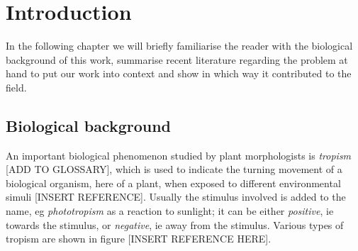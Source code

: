 
\chapter{Introduction} %

\label{introduction} %


\newcommand{\keyword}[1]{\textbf{#1}}
\newcommand{\tabhead}[1]{\textbf{#1}}
\newcommand{\code}[1]{\texttt{#1}}
\newcommand{\file}[1]{\texttt{\bfseries#1}}
\newcommand{\option}[1]{\texttt{\itshape#1}}



In the following chapter we will briefly familiarise the reader with the biological background of this work, summarise recent literature regarding the problem at hand to put our work into context and show in which way it contributed to the field.

\section{Biological background}

An important biological phenomenon studied by plant morphologists is \textit{tropism} [ADD TO GLOSSARY], which is used to indicate the turning movement of a biological organism, here of a plant, when exposed to different environmental simuli [INSERT REFERENCE]. Usually the stimulus involved is added to the name, eg \textit{phototropism} as a reaction to sunlight; it can be either \textit{positive}, ie towards the stimulus, or \textit{negative}, ie away from the stimulus. 
Various types of tropism are shown in figure [INSERT REFERENCE HERE].

